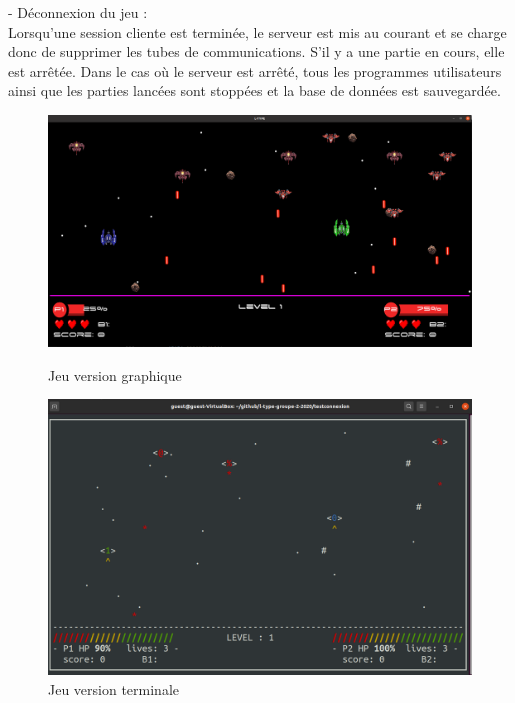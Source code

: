 \documentclass[a4paper,12pt]{article}
\begin{document}
- Déconnexion du jeu : \\
Lorsqu'une session cliente est terminée, le serveur est mis au courant et se charge donc de supprimer les tubes de communications. S'il y a une partie en cours, elle est arrêtée. 
Dans le cas où le serveur est arrêté, tous les programmes utilisateurs ainsi que les parties lancées sont stoppées et la base de données est sauvegardée. \\
\begin{figure}
\centering
\includegraphics[scale=0.21]{images/ingameGui.png}
\caption{Jeu version graphique}

\includegraphics[scale=0.34]{images/ingameTerm.png}
\caption{Jeu version terminale}
\end{figure}
\end{document}
